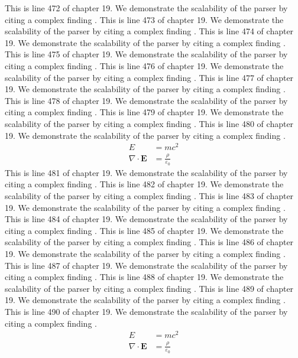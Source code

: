 This is line 472 of chapter 19. We demonstrate the scalability of the parser by citing a complex finding \cite{ref19_472}.
This is line 473 of chapter 19. We demonstrate the scalability of the parser by citing a complex finding \cite{ref19_473}.
This is line 474 of chapter 19. We demonstrate the scalability of the parser by citing a complex finding \cite{ref19_474}.
This is line 475 of chapter 19. We demonstrate the scalability of the parser by citing a complex finding \cite{ref19_475}.
This is line 476 of chapter 19. We demonstrate the scalability of the parser by citing a complex finding \cite{ref19_476}.
This is line 477 of chapter 19. We demonstrate the scalability of the parser by citing a complex finding \cite{ref19_477}.
This is line 478 of chapter 19. We demonstrate the scalability of the parser by citing a complex finding \cite{ref19_478}.
This is line 479 of chapter 19. We demonstrate the scalability of the parser by citing a complex finding \cite{ref19_479}.
This is line 480 of chapter 19. We demonstrate the scalability of the parser by citing a complex finding \cite{ref19_480}.
\begin{align*}
  E &= mc^2 \\
  \nabla \cdot \mathbf{E} &= \frac{\rho}{\varepsilon_0}
\end{align*}
This is line 481 of chapter 19. We demonstrate the scalability of the parser by citing a complex finding \cite{ref19_481}.
This is line 482 of chapter 19. We demonstrate the scalability of the parser by citing a complex finding \cite{ref19_482}.
This is line 483 of chapter 19. We demonstrate the scalability of the parser by citing a complex finding \cite{ref19_483}.
This is line 484 of chapter 19. We demonstrate the scalability of the parser by citing a complex finding \cite{ref19_484}.
This is line 485 of chapter 19. We demonstrate the scalability of the parser by citing a complex finding \cite{ref19_485}.
This is line 486 of chapter 19. We demonstrate the scalability of the parser by citing a complex finding \cite{ref19_486}.
This is line 487 of chapter 19. We demonstrate the scalability of the parser by citing a complex finding \cite{ref19_487}.
This is line 488 of chapter 19. We demonstrate the scalability of the parser by citing a complex finding \cite{ref19_488}.
This is line 489 of chapter 19. We demonstrate the scalability of the parser by citing a complex finding \cite{ref19_489}.
This is line 490 of chapter 19. We demonstrate the scalability of the parser by citing a complex finding \cite{ref19_490}.
\begin{align*}
  E &= mc^2 \\
  \nabla \cdot \mathbf{E} &= \frac{\rho}{\varepsilon_0}
\end{align*}
